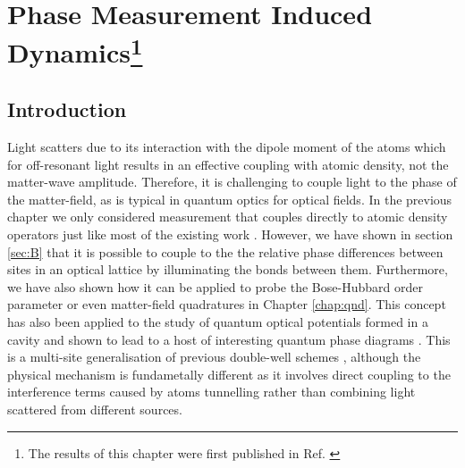 
\chapter[Phase Measurement Induced Dynamics]
        {Phase Measurement Induced Dynamics\footnote{The results of
            this chapter were first published in
            Ref. \cite{kozlowski2016phase}}}

\ifpdf
    \graphicspath{{Chapter6/Figs/Raster/}{Chapter6/Figs/PDF/}{Chapter6/Figs/}}
\else
    \graphicspath{{Chapter6/Figs/Vector/}{Chapter6/Figs/}}
\fi


\section{Introduction}

Light scatters due to its interaction with the dipole moment of the
atoms which for off-resonant light results in an effective coupling
with atomic density, not the matter-wave amplitude. Therefore, it is
challenging to couple light to the phase of the matter-field, as is
typical in quantum optics for optical fields. In the previous chapter
we only considered measurement that couples directly to atomic density
operators just like most of the existing work \cite{LP2009, rogers2014,
  mekhov2012, ashida2015, ashida2015a}. However, we have shown in
section \ref{sec:B} that it is possible to couple to the the relative
phase differences between sites in an optical lattice by illuminating
the bonds between them. Furthermore, we have also shown how it can be
applied to probe the Bose-Hubbard order parameter or even matter-field
quadratures in Chapter \ref{chap:qnd}. This concept has also been
applied to the study of quantum optical potentials formed in a cavity
and shown to lead to a host of interesting quantum phase diagrams
\cite{caballero2015, caballero2015njp, caballero2016,
  caballero2016a}. This is a multi-site generalisation of previous
double-well schemes \cite{cirac1996, castin1997, ruostekoski1997,
  ruostekoski1998, rist2012}, although the physical mechanism is
fundametally different as it involves direct coupling to the
interference terms caused by atoms tunnelling rather than combining
light scattered from different sources.

